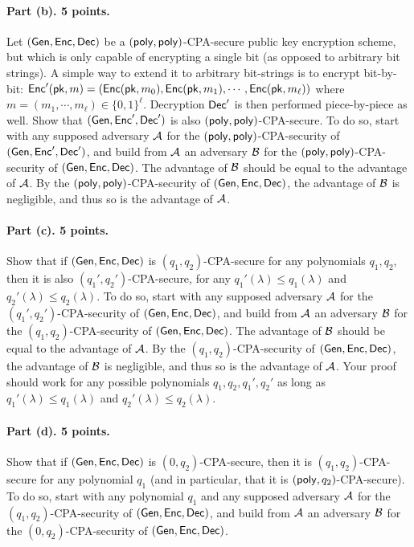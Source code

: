 \documentclass{article}
\begin{document}
\paragraph{Part (b). 5 points.} Let $({\sf Gen},{\sf Enc},{\sf Dec})$ be a $({\sf poly},{\sf poly})$-CPA-secure public key encryption scheme, but which is only capable of encrypting a single bit (as opposed to arbitrary bit strings). A simple way to extend it to arbitrary bit-strings is to encrypt bit-by-bit: ${\sf Enc}'({\sf pk},m)=({\sf Enc}({\sf pk},m_0),{\sf Enc}({\sf pk},m_1),\cdots,{\sf Enc}({\sf pk},m_\ell))$ where $m=(m_1,\cdots,m_\ell)\in\{0,1\}^\ell$. Decryption ${\sf Dec}'$ is then performed piece-by-piece as well. Show that $({\sf Gen},{\sf Enc}',{\sf Dec}')$ is also $({\sf poly},{\sf poly})$-CPA-secure. To do so, start with any supposed adversary ${\mathcal{A}}$ for the $({\sf poly},{\sf poly})$-CPA-security of $({\sf Gen},{\sf Enc}',{\sf Dec}')$, and build from ${\mathcal{A}}$ an adversary ${\mathcal{B}}$ for the $({\sf poly},{\sf poly})$-CPA-security of $({\sf Gen},{\sf Enc},{\sf Dec})$. The advantage of ${\mathcal{B}}$ should be equal to the advantage of ${\mathcal{A}}$. By the $({\sf poly},{\sf poly})$-CPA-security of $({\sf Gen},{\sf Enc},{\sf Dec})$, the advantage of ${\mathcal{B}}$ is negligible, and thus so is the advantage of ${\mathcal{A}}$.

\paragraph{Part (c). 5 points.} Show that if $({\sf Gen},{\sf Enc},{\sf Dec})$ is $(q_1,q_2)$-CPA-secure for any polynomials $q_1,q_2$, then it is also $(q_1',q_2')$-CPA-secure, for any $q_1'(\lambda)\leq q_1(\lambda)$ and $q_2'(\lambda)\leq q_2(\lambda)$. To do so, start with any supposed adversary ${\mathcal{A}}$ for the $(q_1',q_2')$-CPA-security of $({\sf Gen},{\sf Enc},{\sf Dec})$, and build from ${\mathcal{A}}$ an adversary ${\mathcal{B}}$ for the $(q_1,q_2)$-CPA-security of $({\sf Gen},{\sf Enc},{\sf Dec})$. The advantage of ${\mathcal{B}}$ should be equal to the advantage of ${\mathcal{A}}$. By the $(q_1,q_2)$-CPA-security of $({\sf Gen},{\sf Enc},{\sf Dec})$, the advantage of ${\mathcal{B}}$ is negligible, and thus so is the advantage of ${\mathcal{A}}$. Your proof should work for any possible polynomials $q_1,q_2,q_1',q_2'$ as long as $q_1'(\lambda)\leq q_1(\lambda)$ and $q_2'(\lambda)\leq q_2(\lambda)$. 

\paragraph{Part (d). 5 points.} Show that if $({\sf Gen},{\sf Enc},{\sf Dec})$ is $(0,q_2)$-CPA-secure, then it is $(q_1,q_2)$-CPA-secure for any polynomial $q_1$ (and in particular, that it is $({\sf poly},q_2)$-CPA-secure). To do so, start with any polynomial $q_1$ and any supposed adversary ${\mathcal{A}}$ for the $(q_1,q_2)$-CPA-security of $({\sf Gen},{\sf Enc},{\sf Dec})$, and build from ${\mathcal{A}}$ an adversary ${\mathcal{B}}$ for the $(0,q_2)$-CPA-security of $({\sf Gen},{\sf Enc},{\sf Dec})$. 
\end{document}
